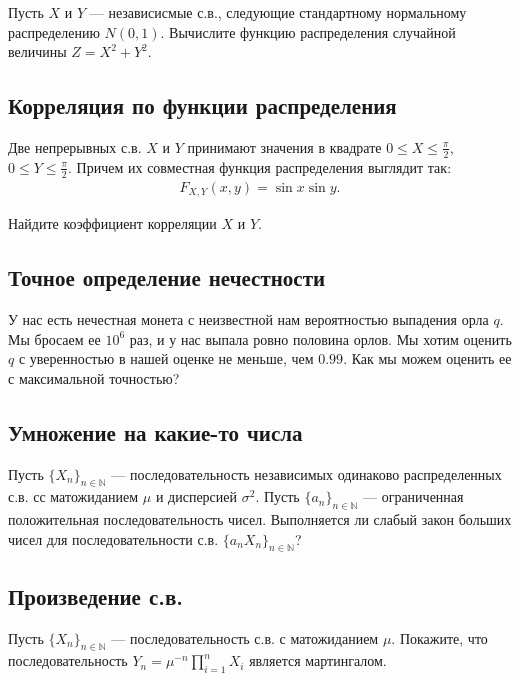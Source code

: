 \documentclass[12pt]{article}
\newcommand\N{\mathbb{N}}
\begin{document}
Пусть $X$ и $Y$ --- независисмые с.в., следующие стандартному нормальному распределению $N(0, 1)$. Вычислите функцию распределения случайной величины $Z = X^2 + Y^2$.



\subsection{Корреляция по функции распределения}

Две непрерывных с.в. $X$ и $Y$ принимают значения в квадрате $0 \le X \le \frac{\pi}{2},$ $0 \le Y \le \frac{\pi}{2}$. Причем их совместная функция распределения выглядит так:
\begin{align*}
    F_{X, Y} (x, y) = \sin x \sin y.
\end{align*}

Найдите коэффициент корреляции $X$ и $Y$.



\subsection{Точное определение нечестности}

У нас есть нечестная монета с неизвестной нам вероятностью выпадения орла $q$. Мы бросаем ее $10^6$ раз, и у нас выпала ровно половина орлов. Мы хотим оценить $q$ с уверенностью в нашей оценке не меньше, чем $0.99$. Как мы можем оценить ее с максимальной точностью? 



\subsection{Умножение на какие-то числа}

Пусть $\{X_n\}_{n \in \N}$ --- последовательность независимых одинаково распределенных с.в. сс матожиданием $\mu$ и дисперсией $\sigma^2$. Пусть $\{a_n\}_{n \in \N}$ --- ограниченная положительная последовательность чисел. Выполняется ли слабый закон больших чисел для последовательности с.в. $\{a_n X_n\}_{n \in \N}$?



\subsection{Произведение с.в.}

Пусть $\{X_n\}_{n \in \N}$ --- последовательность с.в. с матожиданием $\mu$. Покажите, что последовательность $Y_n = \mu^{-n} \prod_{i = 1}^n X_i$ является мартингалом.
\end{document}
